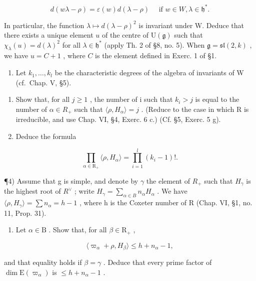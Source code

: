 \[
d (w \lambda - \rho) = \varepsilon (w) d (\lambda - \rho) \quad \text { if } w \in W, \lambda \in \mathfrak {h} ^ {*}.
\]

In particular, the function \(\lambda \mapsto d(\lambda - \rho)^2\) is invariant under W. Deduce that there exists a unique element \(u\) of the centre of \(\mathrm{U}(\mathfrak{g})\) such that \(\chi_{\lambda}(u) = d(\lambda)^2\) for all \(\lambda \in \mathfrak{h}^*\) (apply Th. 2 of §8, no. 5). When \(\mathfrak{g} = \mathfrak{sl}(2,k)\) , we have \(u = C + 1\) , where \(C\) is the element defined in Exerc. 1 of §1.

\begin{enumerate}
\def\labelenumi{\arabic{enumi})}
\setcounter{enumi}{2}
\tightlist
\item
  Let \(k_{1}, \ldots, k_{l}\) be the characteristic degrees of the algebra of invariants of W (cf.~Chap. V, §5).
\end{enumerate}

\begin{enumerate}
\def\labelenumi{\alph{enumi})}
\item
  Show that, for all \(j \geq 1\) , the number of i such that \(k_{i} > j\) is equal to the number of \(\alpha \in R_{+}\) such that \(\langle \rho, H_{\alpha} \rangle = j\) . (Reduce to the case in which R is irreducible, and use Chap. VI, §4, Exerc. 6 c.) (Cf. §5, Exerc. 5 g).
\item
  Deduce the formula
\end{enumerate}

\[
\prod_ {\alpha \in \mathrm{R} _ {+}} \langle \rho , H _ {\alpha} \rangle = \prod_ {i = 1} ^ {l} (k _ {i} - 1)!.
\]

¶4) Assume that g is simple, and denote by \(\gamma\) the element of \(R_{+}\) such that \(H_{\gamma}\) is the highest root of \(R^{\vee}\) ; write \(H_{\gamma} = \sum_{\alpha \in B} n_{\alpha} H_{\alpha}\) . We have \(\langle \rho, H_{\gamma} \rangle = \sum n_{\alpha} = h - 1\) , where h is the Coxeter number of R (Chap. VI, §1, no. 11, Prop. 31).

\begin{enumerate}
\def\labelenumi{\alph{enumi})}
\tightlist
\item
  Let \(\alpha \in \mathrm{B}\) . Show that, for all \(\beta \in \mathrm{R}_{+}\) ,
\end{enumerate}

\[
\langle \varpi_ {\alpha} + \rho , H _ {\beta} \rangle \leq h + n _ {\alpha} - 1,
\]

and that equality holds if \(\beta = \gamma\) . Deduce that every prime factor of \(\dim \mathrm{E}(\varpi_{\alpha})\) is \(\leq h + n_{\alpha} - 1\) .

